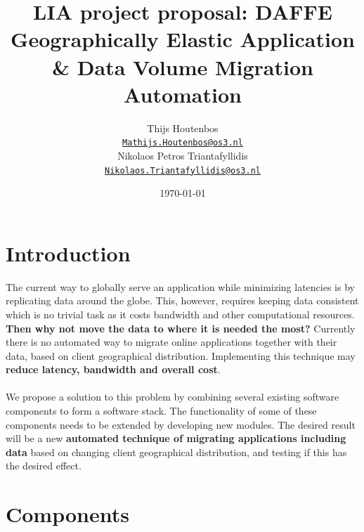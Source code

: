 \documentclass{article}
\title{LIA project proposal: DAFFE\\Geographically Elastic Application \& Data Volume Migration Automation}
\author{Thijs Houtenbos  \\
\href{mailto:Mathijs.Houtenbos@os3.nl}{\texttt{Mathijs.Houtenbos@os3.nl}}\\[0.2cm] 
Nikolaos Petros Triantafyllidis\\
\href{mailto:Nikolaos.Triantafyllidis@os3.nl}{\texttt{Nikolaos.Triantafyllidis@os3.nl}}}
\date{\today}
\begin{document}
\maketitle

\section{Introduction}
The current way to globally serve an application while minimizing latencies is by replicating data around the globe. This, however, requires keeping data consistent which is no trivial task as it costs bandwidth and other computational resources.\\ \textbf{Then why not move the data to where it is needed the most?} Currently there is no automated way to migrate online applications together with their data, based on client geographical distribution. Implementing this technique may \textbf{reduce latency, bandwidth and overall cost}.\\
\\
We propose a solution to this problem by combining several existing software components to form a software stack. The functionality of some of these components needs to be extended by developing new modules. The desired result will be a new \textbf{automated technique of migrating applications including data} based on changing client geographical distribution, and testing if this has the desired effect.



\section{Components}
\end{document}
